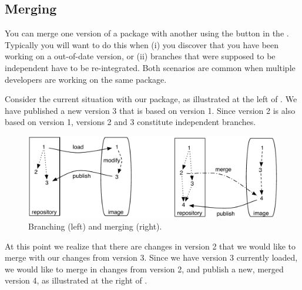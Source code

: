 \documentclass[a4paper,10pt,twoside]{book}
\begin{document}
\subsection{Merging}

You can merge one version of a package with another using the  button in the \MCB. Typically you will want to do this when (i) you discover that you have been working on a out-of-date version, or (ii) branches that were supposed to be independent have to be re-integrated. Both scenarios are common when multiple developers are working on the same package.

Consider the current situation with our  package, as illustrated at the left of . We have published a new version 3 that is based on version 1.
Since version 2 is also based on version 1, versions 2 and 3 constitute independent branches.

\begin{figure}[ht]\centering
	\includegraphics[width=\textwidth]{branching-merging}
	\caption{Branching (left) and merging (right).}
\end{figure}

At this point we realize that there are changes in version 2 that we would like to merge with our changes from version 3.  Since we have version 3 currently loaded, we would like to merge in changes from version 2, and publish a new, merged version 4, as illustrated at the right of .



\end{document}
